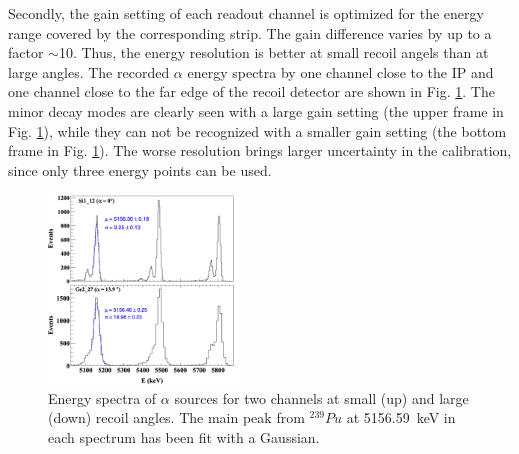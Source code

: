 \documentclass[number,5p]{elsarticle}
\begin{document}
Secondly, the gain setting of each readout channel is optimized for the energy range covered by the corresponding strip.
The gain difference varies by up to a factor $\mathtt{\sim}$10.
Thus, the energy resolution is better at small recoil angels than at large angles.
The recorded $\alpha$ energy spectra by one channel close to the IP and one
channel close to the far edge of the recoil detector are shown in Fig. \ref{fig:alpha_spectrum}.
The minor decay modes are clearly seen with a large gain setting (the upper
frame in Fig. \ref{fig:alpha_spectrum}), while they can not be recognized with a
smaller gain setting (the bottom frame in Fig. \ref{fig:alpha_spectrum}).
The worse resolution brings larger uncertainty in the calibration, since only three energy points can be used.
\begin{figure}[h!]
  \centering
  \includegraphics[width=0.45\textwidth]{./alpha_comparison_corrected_fit_separate.png}
  \caption{Energy spectra of \(\alpha\) sources for two channels at small (up)
    and large (down) recoil angles. The main peak from $^{239}Pu$ at
    \SI{5156.59}{\keV} in each spectrum has been fit with a Gaussian.}
  \label{fig:alpha_spectrum}
\end{figure}
\end{document}
